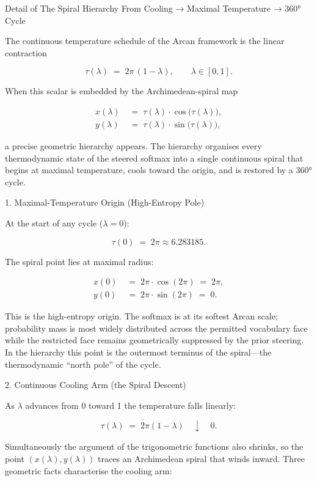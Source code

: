Detail of The Spiral Hierarchy  
From Cooling → Maximal Temperature → 360° Cycle

The continuous temperature schedule of the Arcan framework is the linear contraction

\[
\tau(\lambda)\;=\;2\pi\,(1-\lambda),\qquad\lambda\in[0,1].
\]

When this scalar is embedded by the Archimedean-spiral map

\[
\begin{align*}
x(\lambda)&\;=\;\tau(\lambda)\cdot\cos\bigl(\tau(\lambda)\bigr),\\
y(\lambda)&\;=\;\tau(\lambda)\cdot\sin\bigl(\tau(\lambda)\bigr),
\end{align*}
\]

a precise geometric hierarchy appears. The hierarchy organises every thermodynamic state of the steered softmax into a single continuous spiral that begins at maximal temperature, cools toward the origin, and is restored by a 360° cycle.

1. Maximal-Temperature Origin (High-Entropy Pole)

At the start of any cycle (\(\lambda=0\)):

\[
\tau(0)\;=\;2\pi\approx6.283185.
\]

The spiral point lies at maximal radius:

\[
\begin{align*}
x(0)&\;=\;2\pi\cdot\cos(2\pi)\;=\;2\pi,\\
y(0)&\;=\;2\pi\cdot\sin(2\pi)\;=\;0.
\end{align*}
\]

This is the high-entropy origin. The softmax is at its softest Arcan scale; probability mass is most widely distributed across the permitted vocabulary face while the restricted face remains geometrically suppressed by the prior steering. In the hierarchy this point is the outermost terminus of the spiral—the thermodynamic “north pole” of the cycle.

2. Continuous Cooling Arm (the Spiral Descent)

As \(\lambda\) advances from 0 toward 1 the temperature falls linearly:

\[
\tau(\lambda)\;=\;2\pi(1-\lambda)\quad\downarrow\quad0.
\]

Simultaneously the argument of the trigonometric functions also shrinks, so the point \((x(\lambda),y(\lambda))\) traces an Archimedean spiral that winds inward. Three geometric facts characterise the cooling arm:

